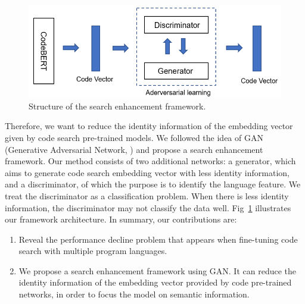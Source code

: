 \begin{figure}[htb]
	\centering
	\includegraphics[width=1\linewidth]{imgs/structure.png}
	\caption{Structure of the search enhancement framework.}
	\label{fig:structure}
\end{figure}

Therefore, we want to reduce the identity information of the embedding vector given by code search pre-trained models. We followed the idea of GAN (Generative Adversarial Network, \citealp{goodfellow2020generative}) and propose a search enhancement framework. Our method consists of two additional networks: a generator, which aims to generate code search embedding vector with less identity information, and a discriminator, of which the purpose is to identify the language feature. We treat the discriminator as a classification problem. When there is less identity information, the discriminator may not classify the data well. Fig~\ref{fig:structure} illustrates our framework architecture.
In summary, our contributions are:
\begin{enumerate} 
\item Reveal the performance decline problem that appears when fine-tuning code search with multiple program languages.
\item We propose a search enhancement framework using GAN. It can reduce the identity information of the embedding vector provided by code pre-trained networks, in order to focus the model on semantic information.
\end{enumerate} 


